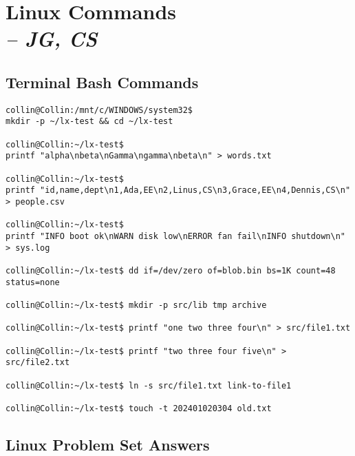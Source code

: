 \chapter{Linux Commands \\
\small{\textit{-- JG, CS}}
\label{Chapter::LinuxCommands}}
\section{Terminal Bash Commands}
\begin{verbatim}
collin@Collin:/mnt/c/WINDOWS/system32$ 
mkdir -p ~/lx-test && cd ~/lx-test

collin@Collin:~/lx-test$ 
printf "alpha\nbeta\nGamma\ngamma\nbeta\n" > words.txt

collin@Collin:~/lx-test$ 
printf "id,name,dept\n1,Ada,EE\n2,Linus,CS\n3,Grace,EE\n4,Dennis,CS\n" > people.csv

collin@Collin:~/lx-test$ 
printf "INFO boot ok\nWARN disk low\nERROR fan fail\nINFO shutdown\n" > sys.log

collin@Collin:~/lx-test$ dd if=/dev/zero of=blob.bin bs=1K count=48 status=none

collin@Collin:~/lx-test$ mkdir -p src/lib tmp archive

collin@Collin:~/lx-test$ printf "one two three four\n" > src/file1.txt

collin@Collin:~/lx-test$ printf "two three four five\n" > src/file2.txt

collin@Collin:~/lx-test$ ln -s src/file1.txt link-to-file1

collin@Collin:~/lx-test$ touch -t 202401020304 old.txt    
\end{verbatim}



\section{Linux Problem Set Answers}

